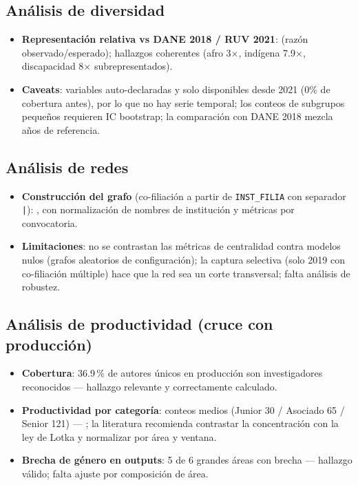 \subsection{Análisis de diversidad}

\begin{itemize}
  \item \textbf{Representación relativa vs DANE 2018 / RUV 2021}:
         (razón observado/esperado); hallazgos
        coherentes (afro 3$\times$, indígena 7.9$\times$, discapacidad 8$\times$
        subrepresentados).
  \item \textbf{Caveats}: variables auto-declaradas y solo disponibles desde 2021
        (0\% de cobertura antes), por lo que no hay serie temporal; los conteos de
        subgrupos pequeños requieren IC bootstrap; la comparación con DANE 2018
        mezcla años de referencia.
\end{itemize}

\subsection{Análisis de redes}

\begin{itemize}
  \item \textbf{Construcción del grafo} (co-filiación a partir de
        \texttt{INST\_FILIA} con separador \texttt{|}): ,
        con normalización de nombres de institución y métricas por convocatoria.
  \item \textbf{Limitaciones}: no se contrastan las métricas de centralidad contra
        modelos nulos (grafos aleatorios de configuración); la captura selectiva
        (solo 2019 con co-filiación múltiple) hace que la red sea un corte
        transversal; falta análisis de robustez.
\end{itemize}

\subsection{Análisis de productividad (cruce con producción)}

\begin{itemize}
  \item \textbf{Cobertura}: 36.9\,\% de autores únicos en producción son
        investigadores reconocidos — hallazgo relevante y correctamente calculado.
  \item \textbf{Productividad por categoría}: conteos medios (Junior 30 /
        Asociado 65 / Senior 121) — ; la literatura
        recomienda contrastar la concentración con la ley de Lotka y normalizar
        por área y ventana.
  \item \textbf{Brecha de género en outputs}: 5 de 6 grandes áreas con brecha —
        hallazgo válido; falta ajuste por composición de área.
\end{itemize}

